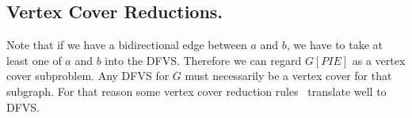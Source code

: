 
\subsection{Vertex Cover Reductions.}
Note that if we have a bidirectional edge between $a$ and $b$, we have to take at least one of $a$ and $b$ into the DFVS. Therefore we can regard $G[PIE]$ as a vertex cover subproblem. Any DFVS for $G$ must necessarily be a vertex cover for that subgraph. For that reason some vertex cover reduction rules~\cite{Fomin2009MeasureAndConquer} translate well to DFVS.
